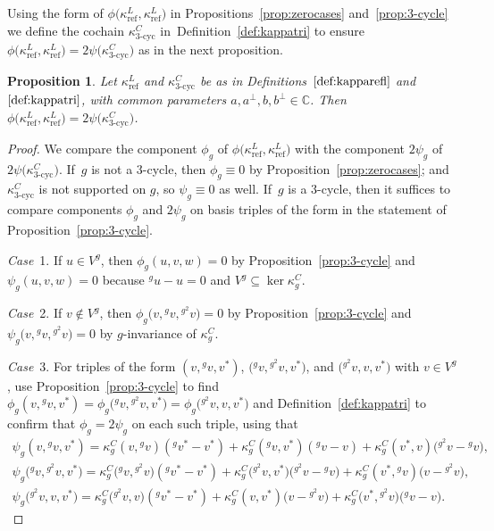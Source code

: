 \documentclass[pdftex]{sigma}
\numberwithin{equation}{section}
\newtheorem{Proposition}[Theorem]{Proposition}
 { \theoremstyle{definition}
\newtheorem{Definition}[Theorem]{Definition}
\newtheorem{Remark}[Theorem]{Remark}
\newtheorem{case}{Case}}
\newcommand{\actby}[1]{{}^{#1}}
\newcommand{\actbylessspace}[1]{{}^{#1}\!}
\DeclareMathOperator{\refl}{ref}
\DeclareMathOperator{\tri}{3-cyc}
\begin{document}
Using the form of $\phi\big(\kappa^L_{\refl},\kappa^L_{\refl}\big)$ in Propositions~\ref{prop:zerocases} and~\ref{prop:3-cycle} we define
the cochain $\kappa^C_{\tri}$ in~Defi\-nition~\ref{def:kappatri} to
ensure $\phi\big(\kappa^L_{\refl},\kappa^L_{\refl}\big)=2\psi\big(\kappa^C_{\tri}\big)$
as in the next proposition.

\begin{Proposition}\label{prop:phiL2L2=2psiC3}
 Let $\kappa^L_{\refl}$ and $\kappa^C_{\tri}$
 be as in Definitions~$\ref{def:kapparefl}$ and $\ref{def:kappatri}$, with common
 parameters $a,a^\perp,b,b^\perp \in\mathbb{C}$. Then
 $\phi\big(\kappa^L_{\refl},\kappa^L_{\refl}\big)=2\psi\big(\kappa^C_{\tri}\big)$.
\end{Proposition}

\begin{proof}
	We compare the component $\phi_g$ of $\phi\big(\kappa^L_{\refl},\kappa^L_{\refl}\big)$
	with the component $2\psi_g$ of $2\psi\big(\kappa^C_{\tri}\big)$. If~$g$ is not a $3$-cycle, then $\phi_g\equiv 0$ by Proposition~\ref{prop:zerocases};
	and $\kappa^C_{\tri}$ is not supported on $g$, so $\psi_g\equiv 0$ as well.
	If~$g$ is a $3$-cycle, then it suffices to compare components $\phi_g$ and $2\psi_g$
	on basis triples of the form in the statement of Proposition~\ref{prop:3-cycle}.
	
\textit{Case}~1. If $u\in V^g$, then
$\phi_g(u,v,w)=0$
by Proposition~\ref{prop:3-cycle} and $\psi_g(u,v,w)=0$ because $\actby{g}u-u=0$ and $V^g\subseteq\ker\kappa^C_g$.

\textit{Case}~2. If $v \notin V^g$, then $\phi_{g}\big(v,\actby{g}v,\actbylessspace{g^2}v\big)=0$
by Proposition~\ref{prop:3-cycle} and $\psi_{g}\big(v,\actby{g}v,\actbylessspace{g^2}v\big)=0$
by $g$-invariance of $\kappa^C_g$.
	
\textit{Case}~3. For triples of the form
$(v,\actby{g}v,v^*)$, $\big(\actby{g}v,\actbylessspace{g^2}v,v^*\big)$, and $\big(\actbylessspace{g^2}v,v,v^*\big)$ with $v \in V^g$, use Proposition~\ref{prop:3-cycle} to find $\phi_{g}(v,\actby{g}v,v^*)=\phi_{g}\big(\actby{g}v,\actbylessspace{g^2}v,v^*\big)=\phi_{g}\big(\actbylessspace{g^2}v,v,v^*\big)$
and Definition~\ref{def:kappatri} to confirm that $\phi_g=2\psi_g$ on each such triple, using that
\begin{gather*}
	\psi_{g}(v,\actby{g}v,v^*)
	=\kappa^C_g(v,\actby{g}v)(\actby{g}v^*-v^*)
	+\kappa^C_g(\actby{g}v,v^*)(\actby{g}v-v)
	+\kappa^C_g(v^*,v)\big(\actbylessspace{g^2}v-\actby{g}v\big), \\
	\psi_{g}\big(\actby{g}v,\actbylessspace{g^2}v,v^*\big)
	=\kappa^C_g\big(\actby{g}v,\actbylessspace{g^2}v\big)(\actby{g}v^*-v^*)
	+\kappa^C_g\big(\actbylessspace{g^2}v,v^*\big)\big(\actbylessspace{g^2}v-\actby{g}v\big)
	+\kappa^C_g(v^*,\actby{g}v)\big(v-\actbylessspace{g^2}v\big), \\
	\psi_{g}\big(\actbylessspace{g^2}v,v,v^*\big)
	=\kappa^C_g\big(\actbylessspace{g^2}v,v\big)(\actby{g}v^*-v^*)
	+\kappa^C_g(v,v^*)\big(v-\actbylessspace{g^2}v\big)
	+\kappa^C_g\big(v^*,\actbylessspace{g^2}v)(\actby{g}v-v\big).
\tag*{\qed}
\end{gather*}
\renewcommand{\qed}{}
\end{proof}
\end{document}
